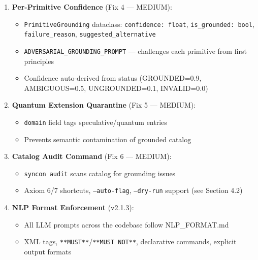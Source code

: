 \documentclass[12pt,a4paper]{article}
\begin{document}
\begin{enumerate}
    \begin{itemize}
    \item T\_⋈ now requires named closing bond/interaction
    \item Detects invalid justifications (linear, rod, chain, axial, etc.)
    \item Keyword indicators: \texttt{AXIOM\_7\_CLOSING\_INDICATORS}, \texttt{AXIOM\_7\_INVALID\_TOPO\_KEYWORDS}
\end{itemize}

    \item 
    \textbf{Per-Primitive Confidence} (Fix 4 --- MEDIUM):

    \begin{itemize}
    \item \texttt{PrimitiveGrounding} dataclass: \texttt{confidence: float}, \texttt{is\_grounded: bool}, \texttt{failure\_reason}, \texttt{suggested\_alternative}
    \item \texttt{ADVERSARIAL\_GROUNDING\_PROMPT} --- challenges each primitive from first principles
    \item Confidence auto-derived from status (GROUNDED=0.9, AMBIGUOUS=0.5, UNGROUNDED=0.1, INVALID=0.0)
\end{itemize}

    \item 
    \textbf{Quantum Extension Quarantine} (Fix 5 --- MEDIUM):

    \begin{itemize}
    \item \texttt{domain} field tags speculative/quantum entries
    \item Prevents semantic contamination of grounded catalog
\end{itemize}

    \item 
    \textbf{Catalog Audit Command} (Fix 6 --- MEDIUM):

    \begin{itemize}
    \item \texttt{syncon audit} scans catalog for grounding issues
    \item Axiom 6/7 shortcuts, \texttt{--auto-flag}, \texttt{--dry-run} support (see Section 4.2)
\end{itemize}

    \item 
    \textbf{NLP Format Enforcement} (v2.1.3):

    \begin{itemize}
    \item All LLM prompts across the codebase follow NLP\_FORMAT.md
    \item XML tags, \texttt{**MUST**}/\texttt{**MUST NOT**}, declarative commands, explicit output formats
\end{itemize}

\end{enumerate}
\end{document}
